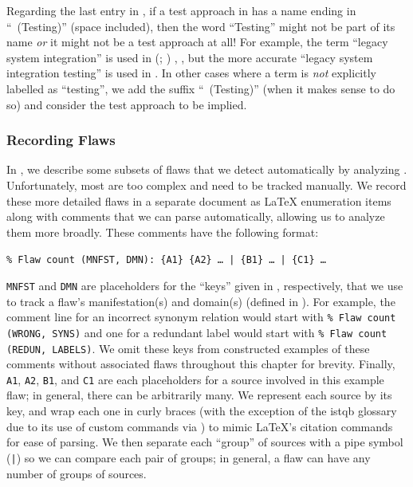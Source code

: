     Regarding the last entry in , if a test approach in
    \ourApproachGlossary{} has a name ending in ``~(Testing)'' (space
    included), then the word ``Testing'' might not be part of its name
    \emph{or} it might not be a test approach at all! For example, the term
    ``legacy system integration'' is used in \ifnotpaper
        \citeauthor{Gerrard2000a} (\citeyear[pp.~12\==13, Tab.~2]{Gerrard2000a};
        \citeyear[Tab.~1]{Gerrard2000b})\else
        \cite[pp.~12\==13, Tab.~2]{Gerrard2000a},
        \cite[Tab.~1]{Gerrard2000b}\fi, but the more accurate
    ``legacy system integration testing'' is used in
    \citeyearpar[pp.~30\==31]{Gerrard2000b}. In other cases where a
    term is \emph{not} explicitly labelled as ``testing'', we add the
    suffix ``~(Testing)'' (when it makes sense to do so) and consider
    the test approach to be implied.

    \clearpage
    \subsubsection{Recording Flaws}\label{record-flaws}
    In , we describe some subsets of flaws that we
    detect automatically by analyzing \ourApproachGlossary. Unfortunately, most
    are too complex and need to be tracked manually. We record these more
    detailed flaws in a separate document as \LaTeX{} enumeration items along
    with comments that we can parse automatically, allowing us to analyze them
    more broadly. These comments have the following format:
    \begin{displayquote}
        \texttt{\% Flaw count (MNFST, DMN): \{A1\} \{A2\} \dots{} | \{B1\} %
            \dots{} | \{C1\} \dots}
    \end{displayquote}
    \texttt{MNFST} and \texttt{DMN} are placeholders for the ``keys'' given in
    , respectively, that we use to
    track a flaw's manifestation(s) and domain(s) (defined in ).
    For example, the comment line for an incorrect synonym relation would start
    with \texttt{\% Flaw count (WRONG, SYNS)} and one for a redundant label
    would start with \texttt{\% Flaw count (REDUN, LABELS)}. We omit these keys
    from constructed examples of these comments without associated flaws
    throughout this chapter for brevity. Finally, \texttt{A1}, \texttt{A2}, %
    \texttt{B1}, and \texttt{C1} are each placeholders for a source involved in
    this example flaw; in general, there can be arbitrarily many. We represent
    each source by its \BibTeX{} key, and wrap each one in curly braces (with
    the exception of the \acs{istqb} glossary due to its use of custom commands
    via ) to mimic \LaTeX{}'s citation commands for ease of
    parsing. We then separate each ``group'' of sources with a pipe symbol
    (\texttt{|}) so we can compare each pair of groups; in general, a flaw can
    have any number of groups of sources.

